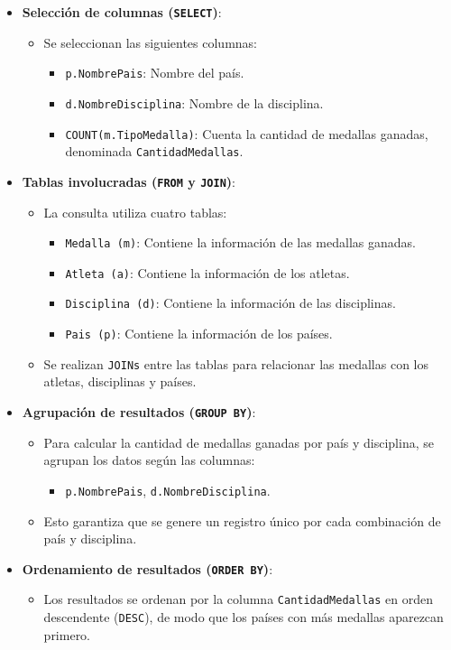 \begin{itemize}
   \item \textbf{Selección de columnas (\texttt{SELECT})}:
   \begin{itemize}
       \item Se seleccionan las siguientes columnas:
       \begin{itemize}
           \item \texttt{p.NombrePais}: Nombre del país.
           \item \texttt{d.NombreDisciplina}: Nombre de la disciplina.
           \item \texttt{COUNT(m.TipoMedalla)}: Cuenta la cantidad de medallas ganadas, denominada \texttt{CantidadMedallas}.
       \end{itemize}
   \end{itemize}
   
   \item \textbf{Tablas involucradas (\texttt{FROM} y \texttt{JOIN})}:
   \begin{itemize}
       \item La consulta utiliza cuatro tablas:
       \begin{itemize}
           \item \texttt{Medalla (m)}: Contiene la información de las medallas ganadas.
           \item \texttt{Atleta (a)}: Contiene la información de los atletas.
           \item \texttt{Disciplina (d)}: Contiene la información de las disciplinas.
           \item \texttt{Pais (p)}: Contiene la información de los países.
       \end{itemize}
       \item Se realizan \texttt{JOINs} entre las tablas para relacionar las medallas con los atletas, disciplinas y países.
   \end{itemize}
   
   \item \textbf{Agrupación de resultados (\texttt{GROUP BY})}:
   \begin{itemize}
       \item Para calcular la cantidad de medallas ganadas por país y disciplina, se agrupan los datos según las columnas:
       \begin{itemize}
           \item \texttt{p.NombrePais}, \texttt{d.NombreDisciplina}.
       \end{itemize}
       \item Esto garantiza que se genere un registro único por cada combinación de país y disciplina.
   \end{itemize}
   
   \item \textbf{Ordenamiento de resultados (\texttt{ORDER BY})}:
   \begin{itemize}
       \item Los resultados se ordenan por la columna \texttt{CantidadMedallas} en orden descendente (\texttt{DESC}), de modo que los países con más medallas aparezcan primero.
   \end{itemize}
\end{itemize}

